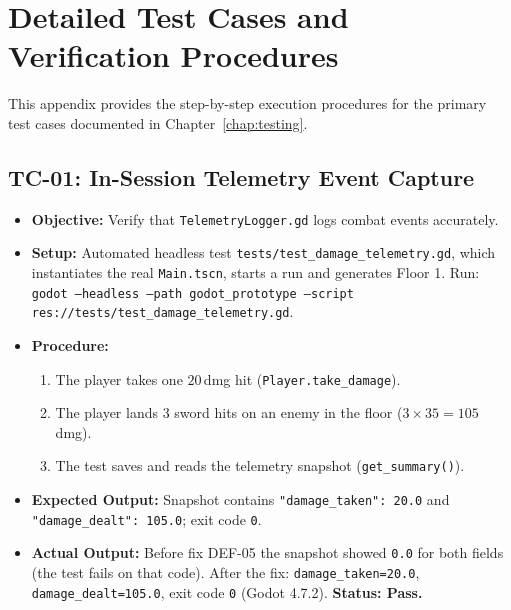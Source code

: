 \chapter{Detailed Test Cases and Verification Procedures}
\label{app:test_cases}

This appendix provides the step-by-step execution procedures for the primary test cases documented in Chapter~\ref{chap:testing}.

\section{TC-01: In-Session Telemetry Event Capture}
\begin{itemize}
    \item \textbf{Objective:} Verify that \texttt{TelemetryLogger.gd} logs combat events accurately.
    \item \textbf{Setup:} Automated headless test \texttt{tests/test\_damage\_telemetry.gd}, which instantiates the real \texttt{Main.tscn}, starts a run and generates Floor 1. Run: \texttt{godot --headless --path godot\_prototype --script res://tests/test\_damage\_telemetry.gd}.
    \item \textbf{Procedure:}
    \begin{enumerate}
        \item The player takes one $20$\,dmg hit (\texttt{Player.take\_damage}).
        \item The player lands 3 sword hits on an enemy in the floor ($3 \times 35 = 105$\,dmg).
        \item The test saves and reads the telemetry snapshot (\texttt{get\_summary()}).
    \end{enumerate}
    \item \textbf{Expected Output:} Snapshot contains \texttt{"damage\_taken": 20.0} and \texttt{"damage\_dealt": 105.0}; exit code \texttt{0}.
    \item \textbf{Actual Output:} Before fix DEF-05 the snapshot showed \texttt{0.0} for both fields (the test fails on that code). After the fix: \texttt{damage\_taken=20.0}, \texttt{damage\_dealt=105.0}, exit code \texttt{0} (Godot 4.7.2). \textbf{Status: Pass.}
\end{itemize}

